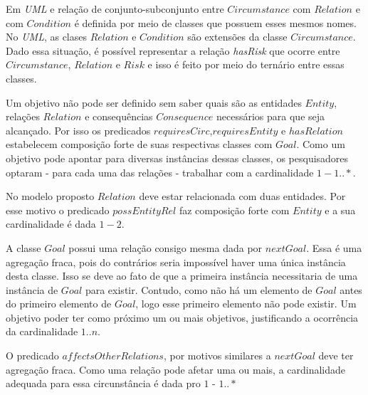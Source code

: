 Em \textit{UML} e relação de conjunto-subconjunto entre $Circumstance$ com $Relation$ e com $Condition$ é definida por meio de classes que possuem esses mesmos nomes. No \textit{UML}, as clases $Relation$ e $Condition$ são extensões da classe $Circumstance$. Dado essa situação, é possível representar a relação \textit{hasRisk} que ocorre entre $Circumstance$, $Relation$ e $Risk$ e isso é feito por meio do ternário entre essas classes. 

Um objetivo não pode ser definido sem saber quais são as entidades $Entity$, relações $Relation$ e consequências $Consequence$ necessários para que seja alcançado. Por isso os predicados $requiresCirc$,$requiresEntity$ e $hasRelation$ estabelecem composição forte de suas respectivas classes com $Goal$. Como um objetivo pode apontar para diversas instâncias dessas classes, os pesquisadores optaram - para cada uma das relações - trabalhar com a cardinalidade 
$1 - 1 .. *$.

No modelo proposto $Relation$ deve estar relacionada com duas entidades. Por esse motivo o predicado $possEntityRel$ faz composição forte com $Entity$ e a sua cardinalidade é dada $1 - 2$. 

A classe $Goal$ possui uma relação consigo mesma dada por $nextGoal$. Essa é uma agregação fraca, pois do contrários seria impossível haver uma única instância desta classe. Isso se deve ao fato de que a primeira instância necessitaria de uma instância de $Goal$ para existir. Contudo, como não há um elemento de $Goal$ antes do primeiro elemento de $Goal$, logo esse primeiro elemento não pode existir. Um objetivo poder ter como próximo um ou mais objetivos, justificando a ocorrência da cardinalidade $1 .. n$. 

O predicado $affectsOtherRelations$, por motivos similares a $nextGoal$ deve ter agregação fraca. Como uma relação pode afetar uma ou mais, a cardinalidade adequada para essa circunstância é dada pro $1$ - $1 ..*$